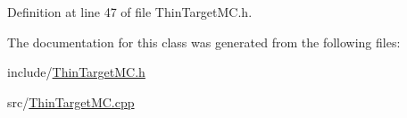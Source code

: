Definition at line 47 of file Thin\-Target\-M\-C.\-h.



The documentation for this class was generated from the following files\-:\begin{DoxyCompactItemize}
\item 
include/\hyperlink{_thin_target_m_c_8h}{Thin\-Target\-M\-C.\-h}\item 
src/\hyperlink{_thin_target_m_c_8cpp}{Thin\-Target\-M\-C.\-cpp}\end{DoxyCompactItemize}
